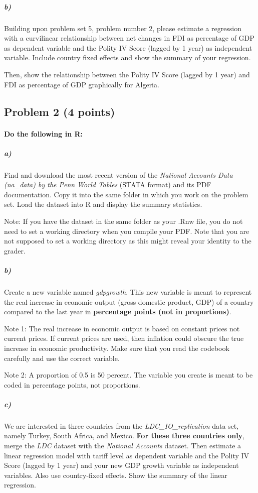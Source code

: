 \documentclass[12pt]{article}
\begin{document}
\subparagraph{b)} Building upon problem set 5, problem number 2, please estimate a regression with a curvilinear relationship between net changes in FDI as percentage of GDP as dependent variable and the Polity IV Score (lagged by 1 year) as independent variable. Include country fixed effects and show the summary of your regression.

Then, show the relationship between the Polity IV Score (lagged by 1 year) and FDI as percentage of GDP graphically for Algeria.



\subsection*{Problem 2 (4 points)}

\paragraph{Do the following in R:}

\subparagraph{a)} Find and download the most recent version of the \textit{National Accounts Data (na\_data) by the Penn World Tables} (STATA format) and its PDF documentation. Copy it into the same folder in which you work on the problem set. Load the dataset into R and display the summary statistics.

Note: If you have the dataset in the same folder as your .Rnw file, you do not need to set a working directory when you compile your PDF. Note that you are not supposed to set a working directory as this might reveal your identity to the grader.

\subparagraph{b)} Create a new variable named \textit{gdpgrowth}. This new variable is meant to represent the real increase in economic output (gross domestic product, GDP) of a country compared to the last year in \textbf{percentage points (not in proportions)}.

Note 1: The real increase in economic output is based on constant prices not current prices. If current prices are used, then inflation could obscure the true increase in economic productivity. Make sure that you read the codebook carefully and use the correct variable.

Note 2: A proportion of 0.5 is 50 percent. The variable you create is meant to be coded in percentage points, not proportions.

\subparagraph{c)} We are interested in three countries from the \textit{LDC\_IO\_replication} data set, namely Turkey, South Africa, and Mexico. \textbf{For these three countries only}, merge the \textit{LDC} dataset with the \textit{National Accounts} dataset. Then estimate a linear regression model with tariff level as dependent variable and the Polity IV Score (lagged by 1 year) and your new GDP growth variable as independent variables. Also use country-fixed effects. Show the summary of the linear regression.
\end{document}

